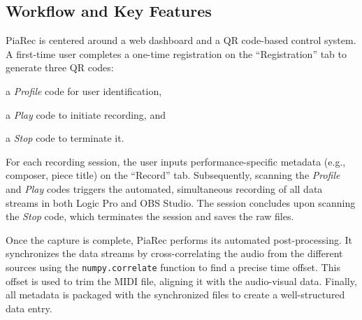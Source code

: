 \documentclass{article}
\begin{document}
\subsection{Workflow and Key Features}
PiaRec is centered around a web dashboard and a QR code-based control system. A first-time user completes a one-time registration on the ``Registration'' tab to generate three QR codes: 
\begin{inparaenum}[(i)]
\item a \emph{Profile} code for user identification, 
\item a \emph{Play} code to initiate recording, and 
\item a \emph{Stop} code to terminate it.
\end{inparaenum}

For each recording session, the user inputs performance-specific metadata (e.g., composer, piece title) on the ``Record'' tab. Subsequently, scanning the \emph{Profile} and \emph{Play} codes triggers the automated, simultaneous recording of all data streams in both Logic Pro and OBS Studio. The session concludes upon scanning the \emph{Stop} code, which terminates the session and saves the raw files.

Once the capture is complete, PiaRec performs its automated post-processing. It synchronizes the data streams by cross-correlating the audio from the different sources using the \texttt{numpy.correlate} function to find a precise time offset. This offset is used to trim the MIDI file, aligning it with the audio-visual data. Finally, all metadata is packaged with the synchronized files to create a well-structured data entry. %

\end{document}
